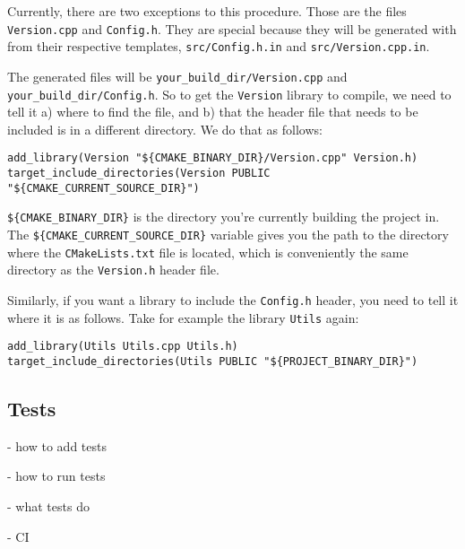 Currently, there are two exceptions to this procedure. Those are the files
\verb|Version.cpp| and \verb|Config.h|. They are special because they will be
generated with \cmake from their respective templates, \verb|src/Config.h.in|
and \verb|src/Version.cpp.in|.

The generated files will be \verb|your_build_dir/Version.cpp| and
\verb|your_build_dir/Config.h|.  So to get the \verb|Version| library to
compile, we need to tell it a) where to find the file, and b) that the header
file that needs to be included is in a different directory. We do that as
follows:


\begin{lstlisting}
add_library(Version "${CMAKE_BINARY_DIR}/Version.cpp" Version.h)
target_include_directories(Version PUBLIC "${CMAKE_CURRENT_SOURCE_DIR}")
\end{lstlisting}

\verb|${CMAKE_BINARY_DIR}| is the directory you're currently building the
project in. The \verb|${CMAKE_CURRENT_SOURCE_DIR}| variable gives you the path
to the directory where the \verb|CMakeLists.txt| file is located, which is
conveniently the same directory as the \verb|Version.h| header file.



Similarly, if you want a library to include the \verb|Config.h| header, you
need to tell it where it is as follows. Take for example the library
\verb|Utils| again:

\begin{lstlisting}
add_library(Utils Utils.cpp Utils.h)
target_include_directories(Utils PUBLIC "${PROJECT_BINARY_DIR}")
\end{lstlisting}





\subsection{Tests}


- how to add tests

- how to run tests

- what tests do

- CI

